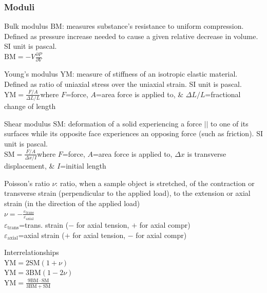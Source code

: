 \documentclass[letterpaper,landscape,10pt]{article}
\newenvironment{mydescription}
{\begin{description}
	\setlength{\itemsep}{0pt}
	\setlength{\parskip}{0pt}
	\setlength{\parsep}{-1pt}}
{\end{description}}
\begin{document}
{\begin{multicols}{4}
	\subsubsection*{Moduli}
		\begin{mydescription}
		  \item[Bulk modulus $\mathrm{BM}$:]measures substance's resistance to
			uniform compression. Defined as pressure increase needed to cause a
			given relative decrease in volume. SI unit is pascal. \\
			$\mathrm{BM} = -V\frac{\partial P}{\partial V}$
		  \item[Young's modulus $\mathrm{YM}$:] measure of stiffness of an
			isotropic elastic material. Defined as ratio of uniaxial stress
			over the uniaxial strain. SI unit is pascal. \\
			$\mathrm{YM} = \frac{F/A}{\Delta L/L}$\hspace{5pt}where $F$=force,
			$A$=area force is applied to, \& $\Delta L/L$=fractional change of
			length
		  \item[Shear modulus $\mathrm{SM}$:]deformation of a solid
			experiencing a force $||$ to one of its surfaces while its opposite
			face experiences an opposing force (such as friction). SI unit is
			pascal. \\
			$\mathrm{SM} = \frac{F/A}{\Delta x/I}$\hspace{5pt}where $F$=force,
			$A$=area force is applied to, $\Delta x$ is transverse
			displacement, \& $I$=initial length
		  \item[Poisson's ratio $\nu$:]ratio, when a sample object is
			stretched, of the contraction or transverse strain (perpendicular
			to the applied load), to the extension or axial strain (in the
			direction of the applied load)\\
			$\nu=-\frac{\varepsilon_\mathrm{trans}}{\varepsilon_\mathrm{axial}}$ \\
			\hspace{10pt}$\varepsilon_{\mathrm{trans}}$=trans. strain ($-$ for axial tension, $+$ for axial compr) \\
			\hspace{10pt}$\varepsilon_{\mathrm{axial}}$=axial strain ($+$ for axial tension, $-$ for axial compr)
		  \item[Interrelationships] \ \\
			$\mathrm{YM} = 2\mathrm{SM}\left( 1+\nu \right)$ \\
			$\mathrm{YM} = 3\mathrm{BM}\left( 1-2\nu \right)$ \\
			$\mathrm{YM} = \frac{9\mathrm{BM}\cdot\mathrm{SM}}{3\mathrm{BM}+\mathrm{SM}}$
		\end{mydescription}


\end{multicols}}
\end{document}
